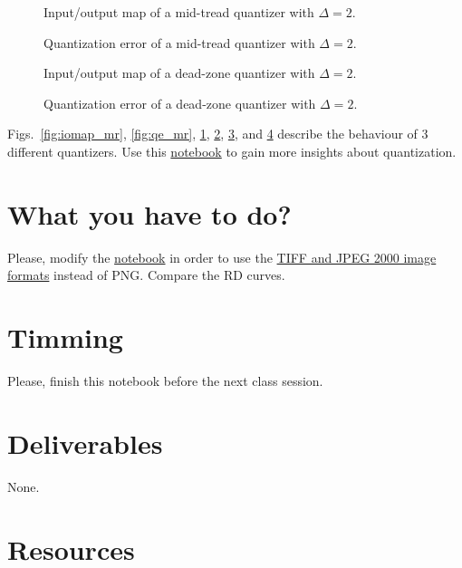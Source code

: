 \begin{figure}
  \centering
  \caption{Input/output map of a mid-tread quantizer with $\Delta=2$.}
  \label{fig:iomap_mt}
\end{figure}

\begin{figure}
  \centering
  \caption{Quantization error of a mid-tread quantizer with $\Delta=2$.}
  \label{fig:qe_mt}
\end{figure}

\begin{figure}
  \centering
  \caption{Input/output map of a dead-zone quantizer with $\Delta=2$.}
  \label{fig:iomap_dz}
\end{figure}

\begin{figure}
  \centering
  \caption{Quantization error of a dead-zone quantizer with $\Delta=2$.}
  \label{fig:qe_dz}
\end{figure}

Figs.~\ref{fig:iomap_mr}, \ref{fig:qe_mr}, \ref{fig:iomap_mt},
\ref{fig:qe_mt}, \ref{fig:iomap_dz}, and \ref{fig:qe_dz} describe the
behaviour of 3 different quantizers.  Use this
\href{https://github.com/Sistemas-Multimedia/Sistemas-Multimedia.github.io/blob/master/study_guide/05-quantization/digital_quantization.ipynb}{notebook}
to gain more insights about quantization.

\section{What you have to do?}
  
Please, modify the
\href{https://github.com/Sistemas-Multimedia/Sistemas-Multimedia.github.io/blob/master/study_guide/05-quantization/quantize_a_frame.ipynb}{notebook}
in order to use the
\href{https://docs.opencv.org/master/d4/da8/group__imgcodecs.html}{TIFF
  and JPEG 2000 image formats} instead of PNG. Compare the RD curves.

\section{Timming}

Please, finish this notebook before the next class session.

\section{Deliverables}

None.

\section{Resources}


